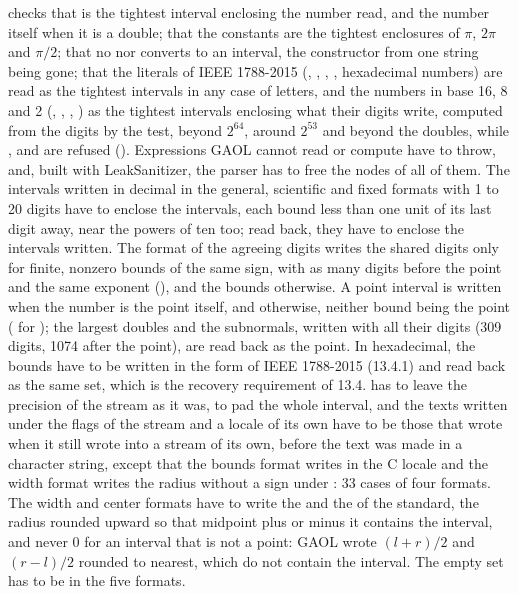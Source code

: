  checks that  is the tightest
interval enclosing the number read, and the number itself when it is a
double; that the constants are the tightest enclosures of $\pi$, $2\pi$ and
$\pi/2$; that no  nor  converts to an
interval, the constructor from one string being gone;\newinvfive{} that the
literals of IEEE 1788-2015 (\code{[entire]}, \code{[ ]}, \code{[1,]},
, hexadecimal numbers) are read as the tightest intervals in
any case of letters, and the numbers in base 16, 8 and 2 (,
, , ) as the tightest intervals
enclosing what their digits write, computed from the digits by the test,
beyond $2^{64}$, around $2^{53}$ and beyond the doubles, while ,
 and  are refused ().
Expressions GAOL cannot read or compute have to throw, and, built with
LeakSanitizer, the parser has to free the nodes of all of them. The
intervals written in decimal in the general, scientific and fixed formats
with 1 to 20 digits have to enclose the intervals, each bound less than one
unit of its last digit away, near the powers of ten too; read back, they
have to enclose the intervals written. The format of the agreeing digits
writes the shared digits only for finite, nonzero bounds of the same sign,
with as many digits before the point and the same exponent
(\code{-1.25\textasciitilde[67, 0]}), and the bounds otherwise. A point
interval is written \code{[a]} when the number is the point itself, and
\code{[l, r]} otherwise, neither bound being the point
(\code{[0.1, 0.1000000000000001]} for ); the largest
doubles and the subnormals, written with all their digits (309 digits, 1074
after the point), are read back as the point.\newinvfive{} In hexadecimal,
the bounds have to be written in the form of IEEE 1788-2015 (13.4.1) and
read back as the same set, which is the recovery requirement of 13.4.
 has to leave the precision of the stream as it was,
 to pad the whole interval, and the texts written under the
flags of the stream and a locale of its own have to be those that  wrote when it still wrote into a
stream of its own, before the text was made in a character string, except that
the bounds format writes in the C locale and the width
format writes the radius without a sign under : 33 cases of
four formats. The width and center formats have to write the
 and the  of the standard, the radius rounded
upward so that midpoint plus or minus it contains the interval, and never 0
for an interval that is not a point: GAOL wrote $(l+r)/2$ and $(r-l)/2$
rounded to nearest, which do not contain the interval.\newinvfive{} The
empty set has to be \code{[empty]} in the five formats.

